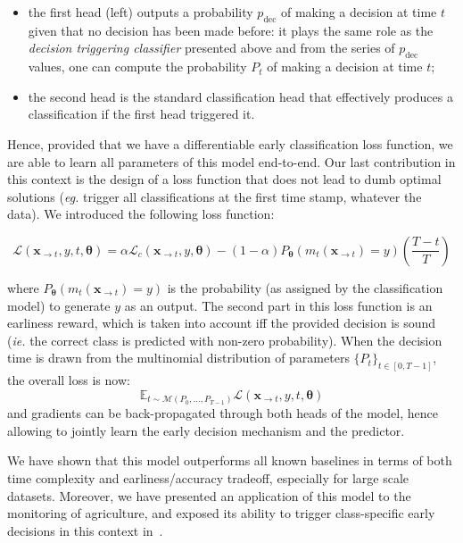 \begin{itemize}
\item the first head (left) outputs a probability $p_\text{dec}$ of making a
decision at
time $t$ given that no decision has been made before: it plays the same role
as the \emph{decision triggering classifier} presented above and from the series of
$p_\text{dec}$ values, one can compute the probability $P_t$ of making a
decision at time $t$;
\item the second head is the standard classification head that effectively produces
a classification if the first head triggered it.
\end{itemize}

Hence, provided that we have a differentiable early classification loss
function, we are able to learn all parameters of this model end-to-end.
Our last contribution in this context is the design of a loss function that
does not lead to dumb optimal solutions (\emph{eg.} trigger all classifications at
the first time stamp, whatever the data).
We introduced the following loss function:

\begin{equation}
    \mathcal{L}(\mathbf{x}_{\rightarrow t}, y, t, \boldsymbol{\theta}) =
        \alpha \mathcal{L}_c(\mathbf{x}_{\rightarrow t}, y, \boldsymbol{\theta})
            - (1-\alpha) P_{\boldsymbol{\theta}}(m_t(\mathbf{x}_{\rightarrow t})=y)
            \left( \frac{T-t}{T} \right)
\end{equation}

where $P_{\boldsymbol{\theta}}(m_t(\mathbf{x}_{\rightarrow t})=y)$ is the probability (as
assigned by the classification model) to generate $y$ as an output.
The second part in this loss function is an earliness reward, which is taken
into account iff the provided decision is sound (\emph{ie.} the correct class is
predicted with non-zero probability).
When the decision time is drawn from the
multinomial distribution of parameters $\{P_t\}_{t \in [0, T-1]}$, the overall
loss is now:
\begin{equation}
    \mathbb{E}_{t \sim \mathcal{M}(P_0, \dots , P_{T-1})}
        \mathcal{L}(\mathbf{x}_{\rightarrow t}, y, t, \boldsymbol{\theta})
\end{equation}
and gradients can be back-propagated through both heads of the model, hence
allowing to jointly learn the early decision mechanism and the predictor.

We have shown that this model outperforms all known baselines in terms of both
time complexity and earliness/accuracy tradeoff, especially for large scale
datasets.
Moreover, we have presented an application of this model to the monitoring of
agriculture, and exposed its ability to trigger class-specific early decisions
in this context in~\cite{ruwurm:hal-02343851}.
